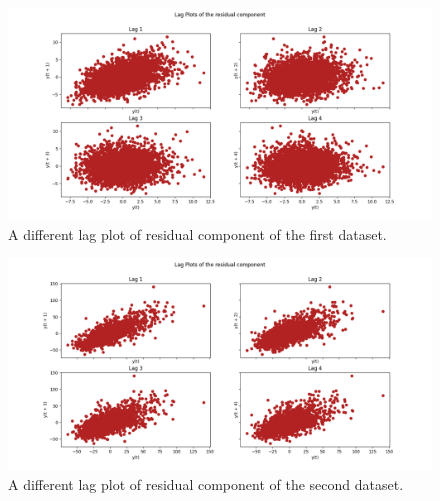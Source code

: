 \begin{figure}[H]
    \centering
    \begin{minipage}[b]{1\textwidth}
        \includegraphics[width=\textwidth]{figures/Ass1/Ass1_D1_Lag_Plots_residual.png}
    \end{minipage}
    \caption{A different lag plot of residual component of the first dataset.}
    \label{fig:Ass1_D1_Lag_Plots_residual}
\end{figure}

\begin{figure}[H]
    \centering
    \begin{minipage}[b]{1\textwidth}
        \includegraphics[width=\textwidth]{figures/Ass1/Ass1_D2_Lag_Plots_residual.png}
    \end{minipage}
    \caption{A different lag plot of residual component of the second dataset.}
    \label{fig:Ass1_D2_Lag_Plots_residual}
\end{figure}

